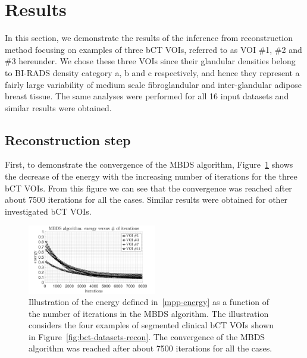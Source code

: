 \documentclass[journal]{IEEEtran}
\begin{document}

\section{Results}
\label{sec:results}

In this section, we demonstrate the results of the inference from
reconstruction method focusing on examples of three bCT VOIs, referred
to as VOI \#1, \#2 and \#3 hereunder. We chose these three VOIs since
their glandular densities belong to BI-RADS density category a, b and
c respectively, and hence they represent a fairly large variability of
medium scale fibroglandular and inter-glandular adipose breast
tissue. The same analyses were performed for all 16 input datasets and
similar results were obtained.

\subsection{Reconstruction step}
\label{sec:reconstruction-step}

First, to demonstrate the convergence of the MBDS algorithm,
Figure~\ref{fig:conv-mbds} shows the decrease of the energy with the
increasing number of iterations for the three bCT VOIs. From this
figure we can see that the convergence was reached after about 7500
iterations for all the cases. Similar results were obtained for other
investigated bCT VOIs.

\begin{figure}[!htb]
  \centering
  \includegraphics[width=0.5\textwidth]
  {figure/convergence_mbds}
  \caption{Illustration of the energy defined in~\eqref{mpp-energy} as
    a function of the number of iterations in the MBDS algorithm. The
    illustration considers the four examples of segmented clinical bCT
    VOIs shown in Figure~\ref{fig:bct-datasets-recon}. The convergence
    of the MBDS algorithm was reached after about 7500 iterations for
    all the cases.}
  \label{fig:conv-mbds}
\end{figure}
\end{document}
